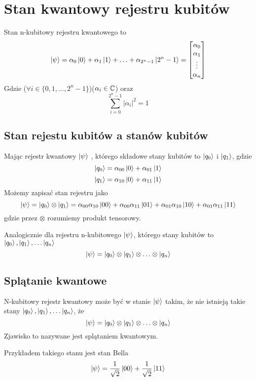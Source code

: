 \section{Stan kwantowy rejestru kubitów}
Stan n-kubitowy rejestru kwantowego to
\[
    \ket{\psi} 
    = 
    \alpha_0 \ket{0} + \alpha_1 \ket{1} + \ldots + \alpha_{2^{n} - 1} \ket{2^{n} - 1}
    =
    \begin{bmatrix}
        \alpha_{0} \\
        \alpha_{1} \\
        \vdots \\
        \alpha_{n}
    \end{bmatrix}
\]
Gdzie ($\forall i \in \{0, 1, \ldots, 2^{n} - 1 \}$)($\alpha_i \in \mathbb{C}$) oraz
\[\sum^{2^{n} - 1}_{i = 0} \left|\alpha_i\right|^{2} = 1\]
\subsection{Stan rejestu kubitów a stanów kubitów}
Mając rejestr kwantowy $\ket{\psi}$ , którego składowe stany kubitów to $\ket{q_0}$ i $\ket{q_1}$, gdzie
\[\ket{q_0} = \alpha_{00}\ket{0} + \alpha_{01}\ket{1}\]
\[\ket{q_1} = \alpha_{10}\ket{0} + \alpha_{11}\ket{1}\]
Możemy zapisać stan rejestru jako
\[\ket{\psi} = \ket{q_0} \otimes \ket{q_1} = \alpha_{00}\alpha_{10}\ket{00} + \alpha_{00}\alpha_{11}\ket{01} + \alpha_{01}\alpha_{10}\ket{10} + \alpha_{01}\alpha_{11}\ket{11}\]
gdzie przez $\otimes$ rozumiemy produkt tensorowy.
\par Analogicznie dla rejestru n-kubitowego $\ket{\psi}$, którego stany kubitów to $\ket{q_0}, \ket{q_1}, \ldots \ket{q_n}$
\[\ket{\psi} = \ket{q_0} \otimes \ket{q_1} \otimes \ldots \otimes \ket{q_n}\]
\subsection{Splątanie kwantowe}
N-kubitowy rejestr kwantowy może być w stanie $\ket{\psi}$ takim, że nie istnieją takie stany $\ket{q_0}, \ket{q_1}, \ldots \ket{q_n}$, że
\[\ket{\psi} = \ket{q_0} \otimes \ket{q_1} \otimes \ldots \otimes \ket{q_n}\]
Zjawisko to nazywane jest splątaniem kwantowym.
\par Przykładem takiego stanu jest stan Bella
\[\ket{\psi} = \frac{1}{\sqrt{2}}\ket{00} + \frac{1}{\sqrt{2}}\ket{11}\]
